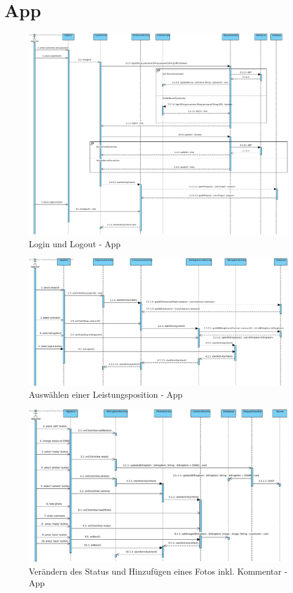 \section{App}
\begin{figure}[H]
	\centering
	\includegraphics[width=\linewidth]{img/diagrams/App login, pull data, logout.pdf}		
	\caption{Login und Logout - App}
	\label{fig:sequenzdiagramm-app}
\end{figure}

\begin{figure}[H]
\centering
\includegraphics[width=\linewidth]{img/diagrams/Select BillingItem.pdf}		
\caption{Auswählen einer Leistungsposition - App}
\label{fig:sequenzdiagramm-app}
\end{figure}

\begin{figure}[H]
	\centering
	\includegraphics[width=\linewidth]{img/diagrams/change status, take photo.pdf}		
	\caption{Verändern des Status und Hinzufügen eines Fotos inkl. Kommentar - App}
	\label{fig:sequenzdiagramm-app}
\end{figure}
